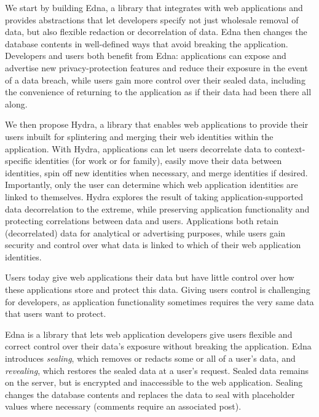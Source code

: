 \label{sec:intro:approach}
We start by building Edna, a library that integrates with web applications and
provides abstractions that let developers specify not just wholesale removal of
data, but also flexible redaction or decorrelation of data. Edna then changes
the database contents in well-defined ways that avoid breaking the application.
Developers and users both benefit from Edna: applications can expose and
advertise new privacy-protection features and reduce their exposure in the event
of a data breach, while users gain more control over their sealed data,
including the convenience of returning to the application as if their data had
been there all along.

We then propose Hydra, a library that enables web applications to provide their
users inbuilt for splintering and merging their web identities within the
application. With Hydra, applications can let users decorrelate data to
context-specific identities (\eg for work or for family), easily
move their data between identities, spin off new identities when necessary, and
merge identities if desired. Importantly, only the user can determine which
web application identities are linked to themselves.
%
Hydra explores the result of taking application-supported data
decorrelation to the extreme, while preserving application functionality and
protecting correlations between data and users. Applications both retain
(decorrelated) data for \eg analytical or advertising purposes, while users gain
security and control over what data is linked to which of their web application
identities.

Users today give web applications their data but have little control over how
these applications store and protect this data.  Giving users control is
challenging for developers, as application functionality sometimes requires the
very same data that users want to protect.

Edna is a library that lets web application developers give users flexible and
correct control over their data’s exposure without breaking the application.
%
Edna introduces \emph{sealing}, which removes or redacts some or all of a user's
data, and \emph{revealing}, which restores the sealed data at a user's request.
Sealed data remains on the server, but is encrypted and inaccessible to the web
application. Sealing changes the database contents and replaces the data to seal
with placeholder values where necessary (\eg comments require an associated
post). 


